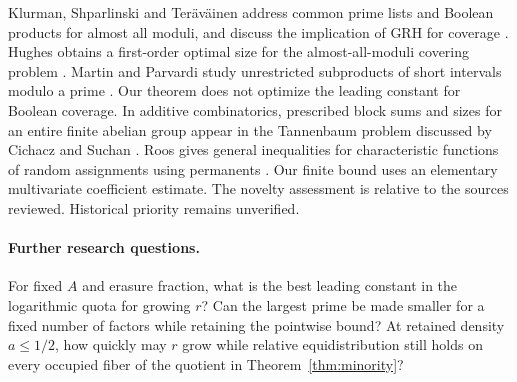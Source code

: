 \documentclass[11pt]{article}
\begin{document}
Klurman, Shparlinski and Ter\"av\"ainen address common prime lists and Boolean products for almost all moduli, and discuss the implication of GRH for coverage \cite{kst}. Hughes obtains a first-order optimal size for the almost-all-moduli covering problem \cite{hughes}. Martin and Parvardi study unrestricted subproducts of short intervals modulo a prime \cite{martin}. Our theorem does not optimize the leading constant for Boolean coverage. In additive combinatorics, prescribed block sums and sizes for an entire finite abelian group appear in the Tannenbaum problem discussed by Cichacz and Suchan \cite{cichacz}. Roos gives general inequalities for characteristic functions of random assignments using permanents \cite{roos}. Our finite bound uses an elementary multivariate coefficient estimate. The novelty assessment is relative to the sources reviewed. Historical priority remains unverified.

\paragraph{Further research questions.}
For fixed $A$ and erasure fraction, what is the best leading constant in the logarithmic quota for growing $r$? Can the largest prime be made smaller for a fixed number of factors while retaining the pointwise bound? At retained density $a\le1/2$, how quickly may $r$ grow while relative equidistribution still holds on every occupied fiber of the quotient in Theorem~\ref{thm:minority}?
\end{document}
